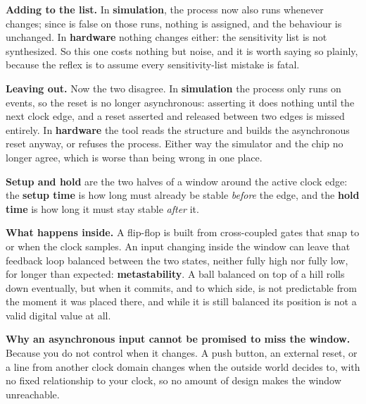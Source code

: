 \textbf{Adding  to the list.} In \textbf{simulation}, the process now also runs whenever
 changes; since  is false on those runs, nothing is assigned, and
the behaviour is unchanged. In \textbf{hardware} nothing changes either: the sensitivity list is not
synthesized. So this one costs nothing but noise, and it is worth saying so plainly, because the
reflex is to assume every sensitivity-list mistake is fatal. 

\textbf{Leaving  out.} Now the two disagree. In \textbf{simulation} the process only
runs on  events, so the reset is no longer asynchronous: asserting it does nothing until
the next clock edge, and a reset asserted and released between two edges is missed entirely. In
\textbf{hardware} the tool reads the
 structure and builds the asynchronous
reset anyway, or refuses the process. Either way the simulator and the chip no longer agree, which
is worse than being wrong in one place. 


\textbf{Setup and hold} are the two halves of a window around the active clock edge: the
\textbf{setup time} is how long  must already be stable \emph{before} the edge, and the
\textbf{hold time} is how long it must stay stable \emph{after} it.

\textbf{What happens inside.} A flip-flop is built from cross-coupled gates that snap to  or
 when the clock samples. An input changing inside the window can leave that feedback loop
balanced between the two states, neither fully high nor fully low, for longer than expected:
\textbf{metastability}. A ball balanced on top of a hill rolls down eventually, but when it commits,
and to which side, is not predictable from the moment it was placed there, and while it is still
balanced its position is not a valid digital value at all. 

\textbf{Why an asynchronous input cannot be promised to miss the window.} Because you do not control
when it changes. A push button, an external reset, or a line from another clock domain changes when
the outside world decides to, with no fixed relationship to your clock, so no amount of design makes
the window unreachable. 

